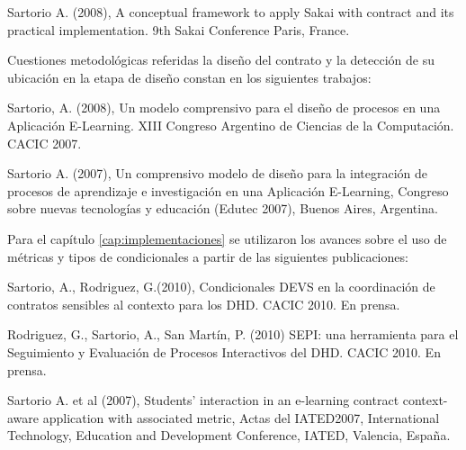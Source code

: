 Sartorio A. (2008),  A conceptual framework  to apply Sakai with contract
and its practical implementation. 9th Sakai Conference Paris, France.

Cuestiones metodológicas referidas la diseño del contrato y la
detección de su ubicación en la etapa de diseño constan en los
siguientes trabajos:

Sartorio, A. (2008), Un modelo comprensivo para el diseño de procesos en
una Aplicación E-Learning. XIII Congreso Argentino de Ciencias de la
Computación. CACIC 2007.


Sartorio A. (2007), Un comprensivo modelo de diseño para la integración
de procesos de aprendizaje e investigación en una Aplicación E-Learning,
Congreso sobre nuevas tecnologías y educación (Edutec 2007),  Buenos Aires, 
Argentina.

Para el capítulo \ref{cap:implementaciones} se utilizaron los avances sobre
el uso de métricas y tipos de condicionales a partir de las siguientes
publicaciones: 

Sartorio, A., Rodriguez, G.(2010), Condicionales DEVS en la coordinación de
contratos sensibles al contexto para los DHD. CACIC 2010. En prensa.

Rodriguez, G., Sartorio, A., San Martín, P. (2010) SEPI: una herramienta para el Seguimiento
y Evaluación de Procesos Interactivos del DHD. CACIC 2010. En prensa.

Sartorio A. et al (2007), Students' interaction in an e-learning contract
context-aware application with associated metric, Actas del IATED2007,
International Technology, Education and Development Conference, IATED, Valencia,
España.





